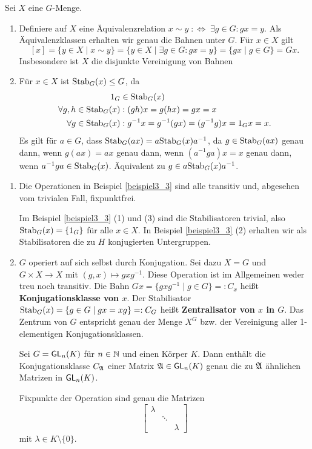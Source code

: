 \begin{rem}\label{rem3_5}
	Sei $X$ eine $G$-Menge.
	\begin{enumerate}[label=(\roman*)]
		\item Definiere auf $X$ eine Äquivalenzrelation $x \sim y \;:\Leftrightarrow\; \exists g \in G : gx = y$. Als Äquivalenzklassen erhalten wir genau die Bahnen unter $G$. Für $x \in X$ gilt
		\[[x] = \{y \in X \mid x \sim y\} = \{y \in X \mid \exists g \in G : gx = y\} = \{gx \mid g \in G\} = Gx.\]
		Insbesondere ist $X$ die disjunkte Vereinigung von Bahnen
		
		\item Für $x \in X$ ist $\mathrm{Stab}_G(x) \leq G$, da
		\begin{align*}
			1_G &\in \mathrm{Stab}_G(x)\\
			\forall g,h \in \mathrm{Stab}_G(x) &: (gh)x = g(hx) = gx = x\\
			\forall g \in \mathrm{Stab}_G(x) &: g^{-1}x = g^{-1}(gx) = (g^{-1}g)x = 1_G x = x.
		\end{align*}
		Es gilt für $a \in G$, dass $\mathrm{Stab}_G(ax) = a\mathrm{Stab}_G(x) a^{-1}$, da $g \in \mathrm{Stab}_G(ax)$ genau dann, wenn $g(ax) = ax$ genau dann, wenn $(a^{-1}ga)x = x$ genau dann, wenn $a^{-1}ga \in \mathrm{Stab}_G(x)$. Äquivalent zu $g \in a\mathrm{Stab}_G(x) a^{-1}$.
	\end{enumerate}
\end{rem}
\begin{beispiel}\label{beispiel3_6}
	\begin{enumerate}[label=(\arabic*)]
		\item Die Operationen in Beispiel \ref{beispiel3_3} sind alle transitiv und, abgesehen vom trivialen Fall, fixpunktfrei.
		
		Im Beispiel \ref{beispiel3_3} (1) und (3) sind die Stabilisatoren trivial, also $\mathrm{Stab}_G(x) = \{1_G\}$ für alle $x \in X$. In Beispiel \ref{beispiel3_3} (2) erhalten wir als Stabilisatoren die zu $H$ konjugierten Untergruppen.
		
		\item $G$ operiert auf sich selbst durch Konjugation. Sei dazu $X=G$ und $G \times X \to X$ mit $(g,x) \mapsto gxg^{-1}$. Diese Operation ist im Allgemeinen weder treu noch transitiv. Die Bahn $Gx = \{gxg^{-1} \mid g \in G\} =: C_x$ heißt \textbf{Konjugationsklasse von $x$}. Der Stabilisator $\mathrm{Stab}_G(x) = \{g \in G \mid gx = xg\} =: C_G$ heißt \textbf{Zentralisator von $x$ in $G$}. Das Zentrum von $G$ entspricht genau der Menge $X^G$ bzw. der Vereinigung aller 1-elementigen Konjugationsklassen.
		
		Sei $G = \mathsf{GL}_n(K)$ für $n \in \mathbb{N}$ und einen Körper $K$. Dann enthält die Konjugationsklasse $C_{\mathfrak{A}}$ einer Matrix $\mathfrak{A} \in \mathsf{GL}_n(K)$ genau die zu $\mathfrak{A}$ ähnlichen Matrizen in $\mathsf{GL}_n(K)$.
		
		Fixpunkte der Operation sind genau die Matrizen 
		\[\begin{bmatrix}
			\lambda & & \\
			& \ddots & \\
			& & \lambda
		\end{bmatrix}\]
		mit $\lambda \in K \setminus \{0\}$.
	\end{enumerate}
\end{beispiel}
